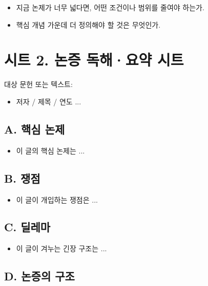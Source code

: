 \begin{itemize}
\tightlist
\item
  지금 논제가 너무 넓다면, 어떤 조건이나 범위를 줄여야 하는가.
\item
  핵심 개념 가운데 더 정의해야 할 것은 무엇인가.
\end{itemize}

\section{시트 2. 논증 독해·요약 시트}\label{uxc2dcuxd2b8-2-uxb17cuxc99d-uxb3c5uxd574uxc694uxc57d-uxc2dcuxd2b8}

대상 문헌 또는 텍스트:

\begin{itemize}
\tightlist
\item
  저자 / 제목 / 연도 ...
\end{itemize}

\subsection{A. 핵심 논제}\label{a-uxd575uxc2ec-uxb17cuxc81c}

\begin{itemize}
\tightlist
\item
  이 글의 핵심 논제는 ...
\end{itemize}

\subsection{B. 쟁점}\label{b-uxc7c1uxc810}

\begin{itemize}
\tightlist
\item
  이 글이 개입하는 쟁점은 ...
\end{itemize}

\subsection{C. 딜레마}\label{c-uxb51cuxb808uxb9c8}

\begin{itemize}
\tightlist
\item
  이 글이 겨누는 긴장 구조는 ...
\end{itemize}

\subsection{D. 논증의 구조}\label{d-uxb17cuxc99duxc758-uxad6cuxc870}

